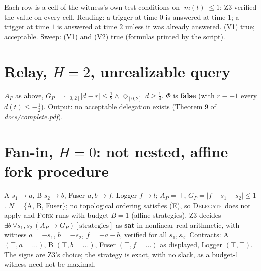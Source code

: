 \documentclass[10pt]{article}\usepackage[margin=0.7in]{geometry}\usepackage{amsmath,amssymb,booktabs,array}
\begin{document}
Each row is a cell of the witness's own test conditions on $|m(t)|\le1$; Z3 verified the value on every cell. Reading: a trigger at time $0$ is answered at time $1$; a trigger at time $1$ is answered at time $2$ unless it was already answered.
(V1) true; acceptable. Sweep: (V1) and (V2) true (formulas printed by the script).
\section{Relay, $H=2$, unrealizable query}
$A_P$ as above, $G_P=\square_{[0,2]}|d-r|\le\tfrac12\wedge\Diamond_{[0,2]}\,d\ge\tfrac14$. $\Phi$ is \textbf{false} (with $r\equiv-1$ every $d(t)\le-\tfrac12$). Output: no acceptable delegation exists (Theorem 9 of \emph{docs/complete.pdf}).
\section{Fan-in, $H=0$: not nested, affine fork procedure}
A $s_1\to a$, B $s_2\to b$, Fuser $a,b\to f$, Logger $f\to l$; $A_P=\top$, $G_P=|f-s_1-s_2|\le1$. $N=\{$A, B, Fuser$\}$; no topological ordering satisfies (E), so \textsc{Delegate} does not apply and \textsc{Fork} runs with budget $B=1$ (affine strategies). Z3 decides $\exists\theta\,\forall s_1,s_2\,(A_P\to G_P)[\text{strategies}]$ as \textbf{sat} in nonlinear real arithmetic, with witness
$a=-s_1$, $b=-s_2$, $f=-a - b$, verified for all $s_1,s_2$. Contracts: A $(\top,a=\ldots)$, B $(\top,b=\ldots)$, Fuser $(\top,f=\ldots)$ as displayed, Logger $(\top,\top)$. The signs are Z3's choice; the strategy is exact, with no slack, as a budget-1 witness need not be maximal.
\end{document}
